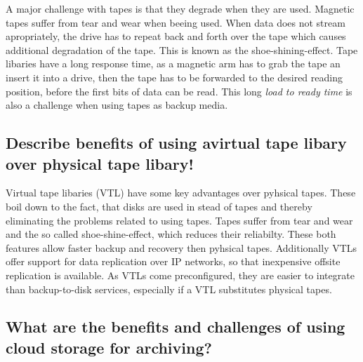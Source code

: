 	A major challenge with tapes is that they degrade when they are used.
	Magnetic tapes suffer from tear and wear when beeing used.
	When data does not stream apropriately,
	the drive has to repeat back and forth over the tape
	which causes additional degradation of the tape.
	This is known as the shoe-shining-effect.
	Tape libaries have a long response time,
	as a magnetic arm has to grab the tape an insert it into a drive,
	then the tape has to be forwarded to the desired reading position,
	before the first bits of data can be read.
	This long \textsl{load to ready time} is also a challenge when using tapes as backup media.

\subsection{Describe benefits of using avirtual tape libary over physical tape libary!} %
\label{sub:describe_benefits_of_using_avirtual_tape_libary_over_physical_tape_libary}
	Virtual tape libaries (VTL) have some key advantages over pyhsical tapes.
	These boil down to the fact,
	that disks are used in stead of tapes
	and thereby eliminating the problems related to using tapes.
	Tapes suffer from tear and wear and the so called shoe-shine-effect,
	which reduces their reliabilty.
	These both features allow faster backup and recovery
	then pyhsical tapes.
	Additionally VTLs offer support for data replication over IP networks,
	so that inexpensive offsite replication is available.
	As VTLs come preconfigured,
	they are easier to integrate than backup-to-disk services,
	especially if a VTL substitutes physical tapes.

\subsection{What are the benefits and challenges of using cloud storage for archiving?} %
\label{sub:what_are_the_benefits_and_challenges_of_using_cloud_storage_for_archiving}


